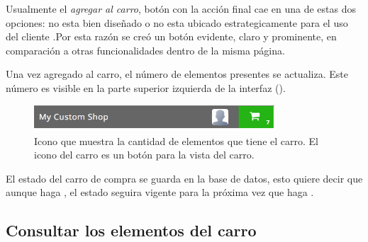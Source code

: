 		Usualmente el \textit{agregar al carro}, botón con la acción final \websiteINT \ecommerceCOM cae en una de estas dos opciones: no esta bien diseñado o no esta ubicado estrategicamente para el uso del cliente \cite{online_official_usabilitygeek_guidelines_usability}.Por esta razón se creó un botón evidente, claro y prominente, en comparación a otras funcionalidades dentro de la misma página.

		Una vez agregado al carro, el número de elementos presentes se actualiza. Este número es visible en la parte superior izquierda de la interfaz ().

		\begin{figure}[H]
			\centering
			\includegraphics[width=0.8\textwidth]{figuras/solution/cart/header.png}
			\caption{Icono que muestra la cantidad de elementos que tiene el carro. El icono del carro es un botón para la vista del carro.}
			\label{figure:solution:cart:header}
		\end{figure}

		El estado del carro de compra se guarda en la base de datos, esto quiere decir que aunque haga \logoutCPT, el estado seguira vigente para la próxima vez que haga \loginUpperCPT.


	\subsection{Consultar los elementos del carro}\label{chapter:section:carro_compra:subsection:request}



